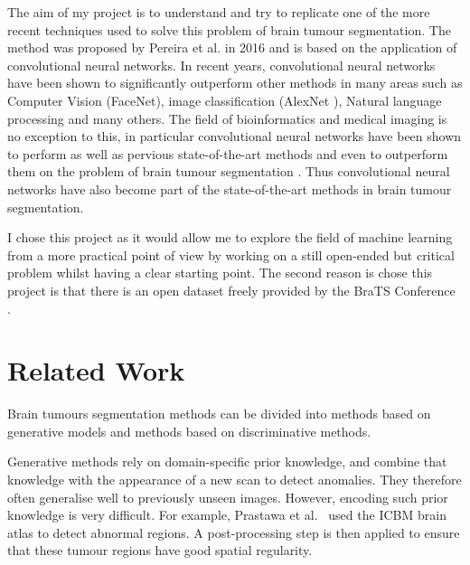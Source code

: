\documentclass[12pt,a4paper,twoside,openright]{report}
\begin{document}
The aim of my project is to understand and try to replicate one of the more recent techniques used to solve this problem of brain tumour segmentation. The method was proposed by Pereira et al.\cite{pereira} in 2016 and is based on the application of convolutional neural networks. In recent years, convolutional neural networks have been shown to significantly outperform other methods in many areas such as Computer Vision (FaceNet\cite{face_net}), image classification (AlexNet \cite{alex_net}), Natural language processing \cite{nlp_deep_learning} and many others. The field of bioinformatics and medical imaging is no exception to this, in particular convolutional neural networks have been shown to perform as well as pervious state-of-the-art methods and even to outperform them on the problem of brain tumour segmentation \cite{pereira} \cite{brats_cnn_with_crf}. Thus convolutional neural networks have also become part of the state-of-the-art methods in brain tumour segmentation.

I chose this project as it would allow me to explore the field of machine learning from a more practical point of view by working on a still open-ended but critical problem whilst having a clear starting point. The second reason is chose this project is that there is an open dataset freely provided by the BraTS Conference \cite{brats-proceedings}.

\section{Related Work}
Brain tumours segmentation methods can be divided into methods based on generative models and methods based on discriminative methods.

Generative methods rely on domain-specific prior knowledge, and combine that knowledge with the appearance of a new scan to detect anomalies. They therefore often generalise well to previously unseen images. However, encoding such prior knowledge is very difficult. For example, Prastawa et al.\ \cite{prastawa} used the ICBM brain atlas to detect abnormal regions. A post-processing step is then applied to ensure that these tumour regions have good spatial regularity.
\end{document}
